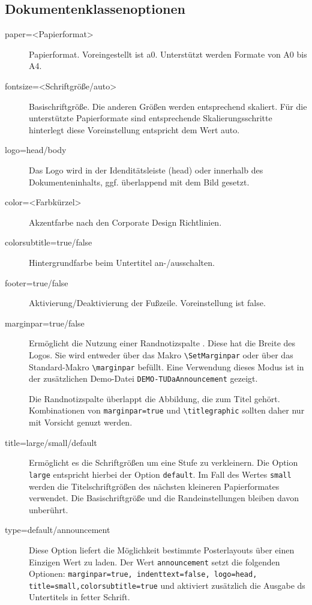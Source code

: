 \documentclass[
	paper=a0,
	ngerman,
	accentcolor=9c,
	logo=body,%
	footer=true,
	]{tudaposter}
\let\file\texttt
\let\code\texttt
\let\tbs\textbackslash
\begin{document}
\begin{multicols}{2}
\subsection*{Dokumentenklassenoptionen}
\begin{description}
	\item[paper=<Papierformat>] Papierformat. Voreingestellt ist a0. Unterstützt werden Formate von A0 bis A4. 
	\item[fontsize=<Schriftgröße/auto>] Basischriftgröße. Die anderen Größen werden entsprechend skaliert. Für die unterstützte Papierformate sind entsprechende Skalierungsschritte hinterlegt diese Voreinstellung entspricht dem Wert auto.
	\item[logo=head/body] Das Logo wird in der Idenditätsleiste (head) oder innerhalb des Dokumenteninhalts, ggf. überlappend mit dem Bild gesetzt.
	\item[color=<Farbkürzel>] Akzentfarbe nach den Corporate Design Richtlinien.
	\item[colorsubtitle=true/false] Hintergrundfarbe beim Untertitel an-/ausschalten.
	\item[footer=true/false] Aktivierung/Deaktivierung der Fußzeile. Voreinstellung ist false.
	\item[marginpar=true/false] Ermöglicht die Nutzung einer Randnotizspalte . Diese hat die Breite des Logos. Sie wird entweder über das Makro \code{\tbs{}SetMarginpar} oder über das Standard-Makro \code{\tbs{}marginpar} befüllt. Eine Verwendung dieses Modus ist in der zusätzlichen Demo-Datei \file{DEMO-TUDaAnnouncement} gezeigt.
	
	Die Randnotizspalte überlappt die Abbildung, die zum Titel gehört. Kombinationen von \code{marginpar=true} und \code{\tbs{}titlegraphic} sollten daher nur mit Vorsicht genuzt werden. 
	
	\item[title=large/small/default] Ermöglicht es die Schriftgrößen um eine Stufe zu verkleinern. Die Option \code{large} entspricht hierbei der Option \code{default}. Im Fall des Wertes \code{small} werden die Titelschriftgrößen des nächsten kleineren Papierformates verwendet. Die Basischriftgröße und die Randeinstellungen bleiben davon unberührt.
	\item[type=default/announcement] Diese Option liefert die Möglichkeit bestimmte Posterlayouts über einen Einzigen Wert zu laden.
	Der Wert \code{announcement} setzt die folgenden Optionen: \code{marginpar=true, indenttext=false, logo=head, title=small,colorsubtitle=true} und aktiviert zusätzlich die Ausgabe ds Untertitels in fetter Schrift.
\end{description}
\end{multicols}
\end{document}
